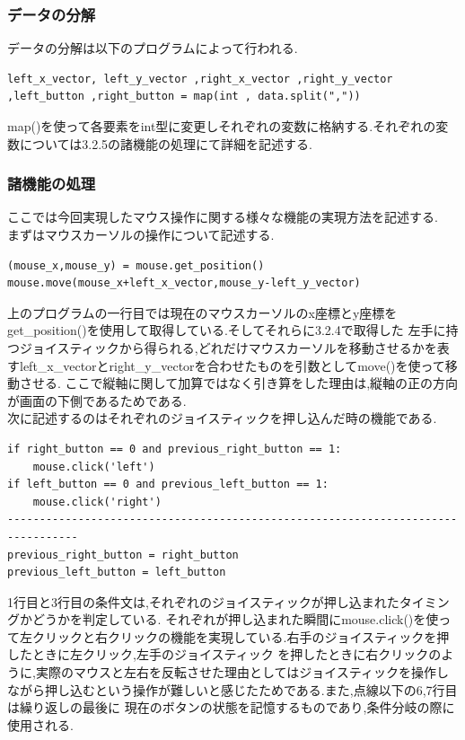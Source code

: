 \documentclass[dvipdfmx]{jarticle}
\begin{document}
\subsubsection{データの分解}
データの分解は以下のプログラムによって行われる.
\begin{lstlisting}
left_x_vector, left_y_vector ,right_x_vector ,right_y_vector ,left_button ,right_button = map(int , data.split(","))
\end{lstlisting}
map()を使って各要素をint型に変更しそれぞれの変数に格納する.それぞれの変数については3.2.5の諸機能の処理にて詳細を記述する.
\subsubsection{諸機能の処理}
ここでは今回実現したマウス操作に関する様々な機能の実現方法を記述する.\\
まずはマウスカーソルの操作について記述する.
\begin{lstlisting}
(mouse_x,mouse_y) = mouse.get_position()
mouse.move(mouse_x+left_x_vector,mouse_y-left_y_vector)
\end{lstlisting}
上のプログラムの一行目では現在のマウスカーソルのx座標とy座標をget\_position()を使用して取得している.そしてそれらに3.2.4で取得した
左手に持つジョイスティックから得られる,どれだけマウスカーソルを移動させるかを表すleft\_x\_vectorとright\_y\_vectorを合わせたものを引数としてmove()を使って移動させる.
ここで縦軸に関して加算ではなく引き算をした理由は,縦軸の正の方向が画面の下側であるためである.\cite{5}\\
次に記述するのはそれぞれのジョイスティックを押し込んだ時の機能である.
\begin{lstlisting}
if right_button == 0 and previous_right_button == 1:
    mouse.click('left')
if left_button == 0 and previous_left_button == 1:
    mouse.click('right')
---------------------------------------------------------------------------------
previous_right_button = right_button
previous_left_button = left_button
\end{lstlisting}
1行目と3行目の条件文は,それぞれのジョイスティックが押し込まれたタイミングかどうかを判定している.
それぞれが押し込まれた瞬間にmouse.click()を使って左クリックと右クリックの機能を実現している.右手のジョイスティックを押したときに左クリック,左手のジョイスティック
を押したときに右クリックのように,実際のマウスと左右を反転させた理由としてはジョイスティックを操作しながら押し込むという操作が難しいと感じたためである.また,点線以下の6,7行目は繰り返しの最後に
現在のボタンの状態を記憶するものであり,条件分岐の際に使用される.\\
\end{document}
